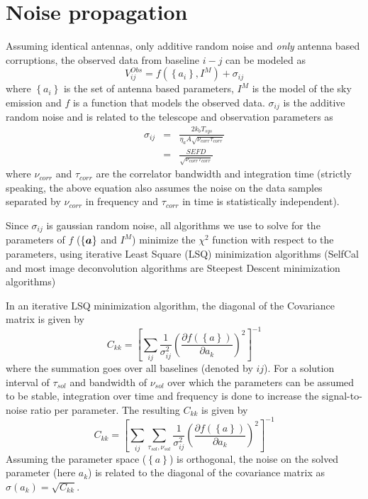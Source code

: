 \documentclass[11pt]{article}
\def\vec#1{\ensuremath{\mathchoice{\mbox{\boldmath$\displaystyle#1$}}
{\mbox{\boldmath$\textstyle#1$}}
{\mbox{\boldmath$\scriptstyle#1$}}
{\mbox{\boldmath$\scriptscriptstyle#1$}}}}
\begin{document}
\section{Noise propagation}

Assuming identical antennas, only additive random noise and {\it only}
antenna based corruptions, the observed data from
baseline $i-j$ can be modeled as
\begin{equation}
V^{Obs}_{ij} = f(\left\{a_i\right\}, I^M) + \sigma_{ij}
\end{equation}
where $\left\{a_i\right\}$ is the set of antenna based parameters, $I^M$ is the
model of the sky emission and $f$ is a function that models the
observed data.  $\sigma_{ij}$ is the additive random noise
and is related to the telescope and observation parameters as
\begin{eqnarray}
\sigma_{ij} &=& \frac{2 k_b T_{sys}}{\eta_a A \sqrt{\nu_{corr} \tau_{corr}}}\\
&=& \frac{SEFD}{\sqrt{\nu_{corr} \tau_{corr}}}
\end{eqnarray}
where $\nu_{corr}$ and $\tau_{corr}$ are the correlator
bandwidth and integration time (strictly speaking, the above equation
also assumes the noise on the data samples separated by
$\nu_{corr}$ in frequency and $\tau_{corr}$ in time is
statistically independent).

Since $\sigma_{ij}$ is gaussian random noise, all algorithms we use to
solve for the parameters of $f$ ($\{\vec{a}\}$ and $I^M$) minimize the
$\chi^2$ function with respect to the parameters, using iterative
Least Square (LSQ) minimization algorithms (SelfCal and most image
deconvolution algorithms are Steepest Descent minimization algorithms)

In an iterative LSQ minimization algorithm, the diagonal of the
Covariance matrix is given by
\begin{equation}
 C_{kk} = \left[ \sum_{ij}\frac{1}{\sigma_{ij}^2} 
   \left(
     \frac{\partial f(\left\{ a \right\})}{\partial a_k} \right)^2\right]^{-1}
\end{equation}
where the summation goes over all baselines (denoted by $ij$).  For a
solution interval of $\tau_{sol}$ and bandwidth of $\nu_{sol}$ over
which the parameters can be assumed to be stable, integration over
time and frequency is done to increase the signal-to-noise ratio per
parameter.  The resulting $C_{kk}$ is given by
\begin{equation}
\label{CKKAvg}
 C_{kk} = \left[ \sum_{ij}\sum_{\tau_{sol},\nu_{sol}}\frac{1}{\sigma_{ij}^2} 
   \left(
     \frac{\partial f(\left\{ a \right\})}{\partial a_k} \right)^2\right]^{-1}
\end{equation}
Assuming the parameter space ($\left\{ a \right\}$) is orthogonal, the
noise on the solved parameter (here $a_k$) is related to the diagonal
of the covariance matrix as $\sigma(a_k) = \sqrt{C_{kk}}$.
\end{document}
